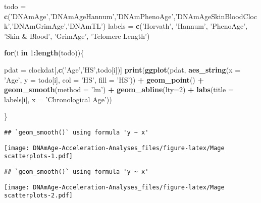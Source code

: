\documentclass[]{article}
\newenvironment{Shaded}{\begin{snugshade}}{\end{snugshade}}
\newcommand{\KeywordTok}[1]{\textcolor[rgb]{0.13,0.29,0.53}{\textbf{#1}}}
\newcommand{\DataTypeTok}[1]{\textcolor[rgb]{0.13,0.29,0.53}{#1}}
\newcommand{\DecValTok}[1]{\textcolor[rgb]{0.00,0.00,0.81}{#1}}
\newcommand{\StringTok}[1]{\textcolor[rgb]{0.31,0.60,0.02}{#1}}
\newcommand{\ControlFlowTok}[1]{\textcolor[rgb]{0.13,0.29,0.53}{\textbf{#1}}}
\newcommand{\OperatorTok}[1]{\textcolor[rgb]{0.81,0.36,0.00}{\textbf{#1}}}
\newcommand{\NormalTok}[1]{#1}
\begin{document}
\begin{Shaded}
\begin{Highlighting}[]
\NormalTok{todo =}\StringTok{ }\KeywordTok{c}\NormalTok{(}\StringTok{'DNAmAge'}\NormalTok{,}\StringTok{'DNAmAgeHannum'}\NormalTok{,}\StringTok{'DNAmPhenoAge'}\NormalTok{,}\StringTok{'DNAmAgeSkinBloodClock'}\NormalTok{,}\StringTok{'DNAmGrimAge'}\NormalTok{,}\StringTok{'DNAmTL'}\NormalTok{)}
\NormalTok{labels =}\StringTok{ }\KeywordTok{c}\NormalTok{(}\StringTok{'Horvath'}\NormalTok{, }\StringTok{'Hannum'}\NormalTok{, }\StringTok{'PhenoAge'}\NormalTok{, }\StringTok{'Skin & Blood'}\NormalTok{, }\StringTok{'GrimAge'}\NormalTok{, }\StringTok{'Telomere Length'}\NormalTok{)}

\ControlFlowTok{for}\NormalTok{(i }\ControlFlowTok{in} \DecValTok{1}\OperatorTok{:}\KeywordTok{length}\NormalTok{(todo))\{}
  
\NormalTok{  pdat =}\StringTok{ }\NormalTok{clockdat[,}\KeywordTok{c}\NormalTok{(}\StringTok{'Age'}\NormalTok{,}\StringTok{'HS'}\NormalTok{,todo[i])]}
  \KeywordTok{print}\NormalTok{(}\KeywordTok{ggplot}\NormalTok{(pdat, }\KeywordTok{aes_string}\NormalTok{(}\DataTypeTok{x =} \StringTok{'Age'}\NormalTok{, }\DataTypeTok{y =}\NormalTok{ todo[i], }\DataTypeTok{col =} \StringTok{'HS'}\NormalTok{, }\DataTypeTok{fill =} \StringTok{'HS'}\NormalTok{)) }\OperatorTok{+}\StringTok{ }\KeywordTok{geom_point}\NormalTok{() }\OperatorTok{+}\StringTok{ }\KeywordTok{geom_smooth}\NormalTok{(}\DataTypeTok{method =} \StringTok{'lm'}\NormalTok{) }\OperatorTok{+}\StringTok{ }
\StringTok{  }\KeywordTok{geom_abline}\NormalTok{(}\DataTypeTok{lty=}\DecValTok{2}\NormalTok{) }\OperatorTok{+}\StringTok{ }\KeywordTok{labs}\NormalTok{(}\DataTypeTok{title =}\NormalTok{ labels[i], }\DataTypeTok{x =} \StringTok{'Chronological Age'}\NormalTok{))}

\NormalTok{\}}
\end{Highlighting}
\end{Shaded}

\begin{verbatim}
## `geom_smooth()` using formula 'y ~ x'
\end{verbatim}

\texttt{[image: DNAmAge-Acceleration-Analyses\_files/figure-latex/Mage scatterplots-1.pdf]}

\begin{verbatim}
## `geom_smooth()` using formula 'y ~ x'
\end{verbatim}

\texttt{[image: DNAmAge-Acceleration-Analyses\_files/figure-latex/Mage scatterplots-2.pdf]}
\end{document}

